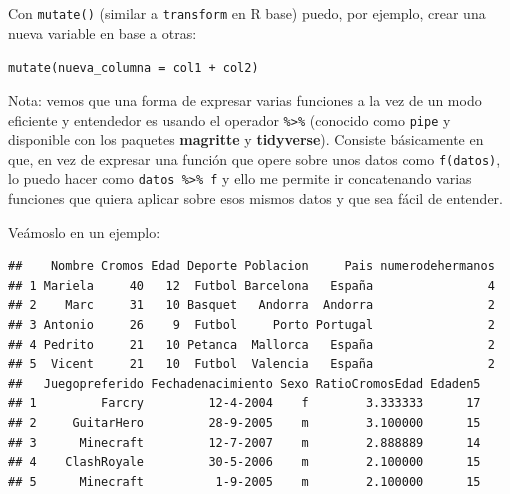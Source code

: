 \documentclass[]{book}
\newenvironment{Shaded}{\begin{snugshade}}{\end{snugshade}}
\newcommand{\KeywordTok}[1]{\textcolor[rgb]{0.13,0.29,0.53}{\textbf{{#1}}}}
\newcommand{\DataTypeTok}[1]{\textcolor[rgb]{0.13,0.29,0.53}{{#1}}}
\newcommand{\DecValTok}[1]{\textcolor[rgb]{0.00,0.00,0.81}{{#1}}}
\newcommand{\StringTok}[1]{\textcolor[rgb]{0.31,0.60,0.02}{{#1}}}
\newcommand{\CommentTok}[1]{\textcolor[rgb]{0.56,0.35,0.01}{\textit{{#1}}}}
\newcommand{\NormalTok}[1]{{#1}}
\theoremstyle{definition}
\theoremstyle{definition}
\theoremstyle{remark}
\begin{document}
Con \texttt{mutate()} (similar a \texttt{transform} en R base) puedo,
por ejemplo, crear una nueva variable en base a otras:

\texttt{mutate(nueva\_columna\ =\ col1\ +\ col2)}

Nota: vemos que una forma de expresar varias funciones a la vez de un
modo eficiente y entendedor es usando el operador
\texttt{\%\textgreater{}\%} (conocido como \texttt{pipe} y disponible
con los paquetes \textbf{magritte} y \textbf{tidyverse}). Consiste
básicamente en que, en vez de expresar una función que opere sobre unos
datos como \texttt{f(datos)}, lo puedo hacer como
\texttt{datos\ \%\textgreater{}\%\ f} y ello me permite ir concatenando
varias funciones que quiera aplicar sobre esos mismos datos y que sea
fácil de entender.

Veámoslo en un ejemplo:

\begin{Shaded}
\end{Shaded}

\begin{verbatim}
##    Nombre Cromos Edad Deporte Poblacion     Pais numerodehermanos
## 1 Mariela     40   12  Futbol Barcelona   España                4
## 2    Marc     31   10 Basquet   Andorra  Andorra                2
## 3 Antonio     26    9  Futbol     Porto Portugal                2
## 4 Pedrito     21   10 Petanca  Mallorca   España                2
## 5  Vicent     21   10  Futbol  Valencia   España                2
##   Juegopreferido Fechadenacimiento Sexo RatioCromosEdad Edaden5
## 1         Farcry         12-4-2004    f        3.333333      17
## 2     GuitarHero         28-9-2005    m        3.100000      15
## 3      Minecraft         12-7-2007    m        2.888889      14
## 4    ClashRoyale         30-5-2006    m        2.100000      15
## 5      Minecraft          1-9-2005    m        2.100000      15
\end{verbatim}
\end{document}
